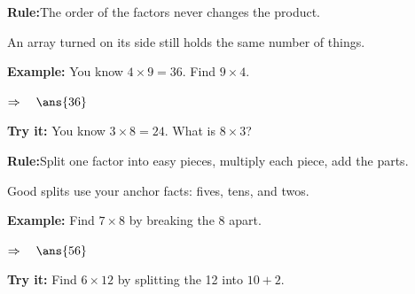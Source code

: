 \documentclass[12pt]{article}
\begin{document}


\begin{formulabox}
\textbf{Rule:}\quad The order of the factors never changes the product.\par
An array turned on its side still holds the same number of things.
\end{formulabox}

\begin{examplebox}
\textbf{Example:} You know $4 \times 9 = 36$. Find $9 \times 4$.

$\Rightarrow\quad\ans{36}$
\end{examplebox}

\begin{tryitbox}
\textbf{Try it:} You know $3 \times 8 = 24$. What is $8 \times 3$?\\[2pt]
\end{tryitbox}


\begin{formulabox}
\textbf{Rule:}\quad Split one factor into easy pieces, multiply each piece, add the parts.\par
Good splits use your anchor facts: fives, tens, and twos.
\end{formulabox}

\begin{examplebox}
\textbf{Example:} Find $7 \times 8$ by breaking the 8 apart.

$\Rightarrow\quad\ans{56}$
\end{examplebox}

\begin{tryitbox}
\textbf{Try it:} Find $6 \times 12$ by splitting the 12 into $10 + 2$.\\[2pt]
\end{tryitbox}

\end{document}
